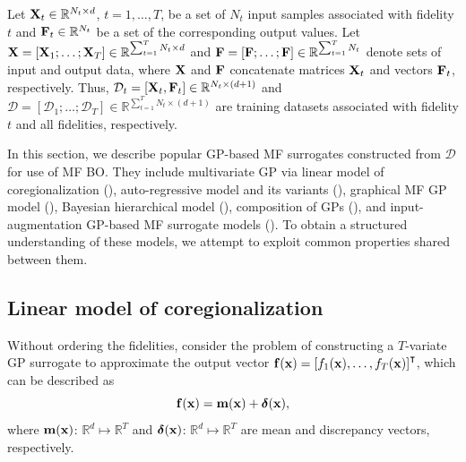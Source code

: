 \documentclass[iicol,sn-basic]{sn-jnl}%
\begin{document}
Let ${\bf X}_{t}\in \mathbb{R}^{N_t \times d}$, $t=1,\dots,T$, be a set of $N_t$ input samples associated with fidelity $t$ and ${\bf F}_{t}\in \mathbb{R}^{N_t}$ be a set of the corresponding output values.
Let ${\bf X}=[{\bf X}_1;\dots;{\bf X}_T] \in \mathbb{R}^{\sum_{t=1}^{T} N_t \times d}$ and ${\bf F}=[{\bf F};\dots;{\bf F}] \in \mathbb{R}^{\sum_{t=1}^{T} N_t}$ denote sets of input and output data, where ${\bf X}$ and ${\bf F}$ concatenate matrices ${\bf X}_t$ and vectors ${\bf F}_t$, respectively. 
Thus, $\mathcal{D}_t=[{\bf X}_t,{\bf F}_t] \in \mathbb{R}^{N_t \times (d+1)}$ and $\mathcal{D}=[\mathcal{D}_1;\dots;\mathcal{D}_T] \in \mathbb{R}^{\sum_{t=1}^{T} N_t \times (d+1)}$ are training datasets associated with fidelity $t$ and all fidelities, respectively.

In this section, we describe popular GP-based MF surrogates constructed from $\mathcal{D}$ for use of MF BO.
They include multivariate GP via linear model of coregionalization (), auto-regressive model and its variants (), graphical MF GP model (), Bayesian hierarchical model (), composition of GPs (), and input-augmentation GP-based MF surrogate models ().
To obtain a structured understanding of these models, we attempt to exploit common properties shared between them.

\subsection{Linear model of coregionalization}\label{Sec41}

Without ordering the fidelities, consider the problem of constructing a $T$-variate GP surrogate to approximate the output vector ${\bf f}({\bf x})=\left[f_1({\bf x}),\dots,f_T({\bf x})\right]^\intercal$, which can be described as
\begin{equation}\label{Eq3}
	{\bf f}({\bf x}) = {\bf m}({\bf x}) + {\boldsymbol \delta}({\bf x}),
\end{equation}
where ${\bf m}({\bf x})$: $\mathbb{R}^d \mapsto \mathbb{R}^T$  and ${\boldsymbol \delta}({\bf x})$: $\mathbb{R}^d \mapsto \mathbb{R}^T$ are mean and discrepancy vectors, respectively.
\end{document}
